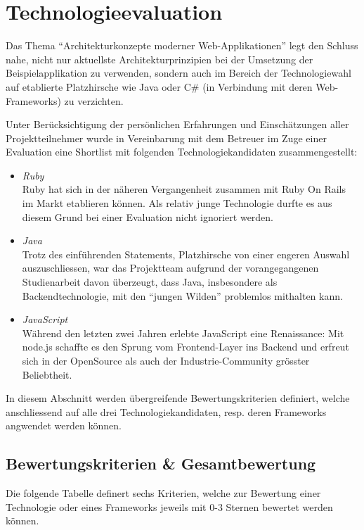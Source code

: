 \section{Technologieevaluation}
Das Thema ``Architekturkonzepte moderner Web-Applikationen'' legt den Schluss nahe, nicht nur aktuellste Architekturprinzipien bei der Umsetzung der Beispielapplikation zu verwenden, sondern auch im Bereich der Technologiewahl auf etablierte Platzhirsche wie Java oder C\# (in Verbindung mit deren Web-Frameworks) zu verzichten.

Unter Berücksichtigung der persönlichen Erfahrungen und Einschätzungen aller Projektteilnehmer wurde in Vereinbarung mit dem Betreuer im Zuge einer Evaluation eine Shortlist mit folgenden Technologiekandidaten zusammengestellt:

\begin{itemize}
	\item \emph{Ruby}\\
	Ruby hat sich in der näheren Vergangenheit zusammen mit Ruby On Rails im Markt etablieren können. Als relativ junge Technologie durfte es aus diesem Grund bei einer Evaluation nicht ignoriert werden.

	\item \emph{Java}\\
	Trotz des einführenden Statements, Platzhirsche von einer engeren Auswahl auszuschliessen, war das Projektteam aufgrund der vorangegangenen Studienarbeit davon überzeugt, dass Java, insbesondere als Backendtechnologie, mit den ``jungen Wilden'' problemlos mithalten kann.

	\item \emph{JavaScript}\\
	Während den letzten zwei Jahren erlebte JavaScript eine Renaissance: Mit node.js schaffte es den Sprung vom Frontend-Layer ins Backend und erfreut sich in der OpenSource als auch der Industrie-Community grösster Beliebtheit.
\end{itemize}

In diesem Abschnitt werden übergreifende Bewertungskriterien definiert, welche anschliessend auf alle drei Technologiekandidaten, resp. deren Frameworks angwendet werden können.

\newpage
\subsection{Bewertungskriterien \& Gesamtbewertung}
Die folgende Tabelle definert sechs Kriterien, welche zur Bewertung einer Technologie oder eines Frameworks jeweils mit 0-3 Sternen bewertet werden können.

